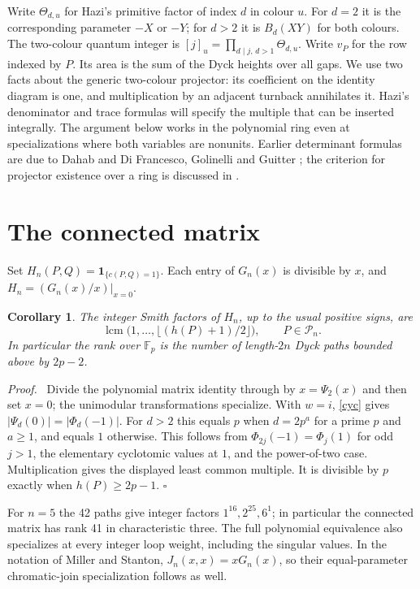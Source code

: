 \documentclass[11pt]{article}
\newtheorem{corollary}[theorem]{Corollary}
\newenvironment{proof}[1][Proof]{\par\noindent\textit{#1.}\ }{\unskip\nobreak\hfill\(\square\)\par}
\newcommand{\F}{\mathbb F}
\newcommand{\nc}{\mathcal P_n}
\begin{document}
Write \(\Theta_{d,u}\) for Hazi's primitive factor of index \(d\)
in colour \(u\). For \(d=2\) it is the corresponding parameter
\(-X\) or \(-Y\); for \(d>2\) it is \(B_d(XY)\) for both colours.
The two-colour quantum integer is
\([j]_u=\prod_{d\mid j,\,d>1}\Theta_{d,u}\).
Write \(v_P\) for the row indexed by \(P\). Its area is the sum of
the Dyck heights over all gaps. We use two facts about the generic
two-colour projector: its coefficient on the identity diagram is one,
and multiplication by an adjacent turnback annihilates it.
Hazi's denominator and trace formulas will specify the multiple
that can be inserted integrally. The argument below works in the
polynomial ring even at specializations where both variables are
nonunits. Earlier determinant formulas are due to Dahab \cite{dahab}
and Di Francesco, Golinelli and Guitter \cite{dfgg}; the criterion
for projector existence over a ring is discussed in \cite{webster,hazi}.



\section{The connected matrix}

Set \(H_n(P,Q)=\mathbf1_{\{c(P,Q)=1\}}\). Each entry of \(G_n(x)\)
is divisible by \(x\), and \(H_n=(G_n(x)/x)|_{x=0}\).
\begin{corollary}\label{integer}
The integer Smith factors of \(H_n\), up to the usual positive signs,
are
\[
       \operatorname{lcm}\bigl(1,\ldots,\lfloor(h(P)+1)/2\rfloor\bigr),
           \qquad P\in\nc .
\]
In particular the rank over \(\F_p\) is the number of length-\(2n\)
Dyck paths bounded above by \(2p-2\).
\end{corollary}
\begin{proof}
Divide the polynomial matrix identity through by \(x=\Psi_2(x)\)
and then set \(x=0\); the unimodular transformations specialize.
With \(w=i\), \eqref{cyc} gives
\(\left|\Psi_d(0)\right|=|\Phi_d(-1)|\).
For \(d>2\) this equals \(p\) when \(d=2p^a\) for a prime \(p\)
and \(a\ge1\), and equals \(1\) otherwise. This follows from
\(\Phi_{2j}(-1)=\Phi_j(1)\) for odd \(j>1\), the elementary
cyclotomic values at \(1\), and the power-of-two case.
Multiplication gives the displayed least common multiple.
It is divisible by \(p\) exactly when \(h(P)\ge2p-1\).
\end{proof}

For \(n=5\) the 42 paths give integer factors \(1^{16},2^{25},6^1\);
in particular the connected matrix has rank 41 in characteristic
three. The full polynomial equivalence also specializes at every
integer loop weight, including the singular values. In the notation
of Miller and Stanton, \(J_n(x,x)=xG_n(x)\), so their equal-parameter
chromatic-join specialization follows as well.
\end{document}
